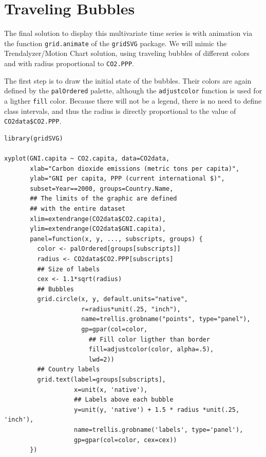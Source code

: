 \documentclass[smallroyalvopaper]{memoir}
\begin{document}
\section{\floweroneleft Traveling Bubbles}
\label{sec-6}
The final solution to display this multivariate time series is with
animation via the function \texttt{grid.animate} of the \texttt{gridSVG}
package. We will mimic the Trendalyzer/Motion Chart solution, using
traveling bubbles of different colors and with radius proportional to
\texttt{CO2.PPP}.

The first step is to draw the initial state of the bubbles. Their
colors are again defined by the \texttt{palOrdered} palette, although the
\texttt{adjustcolor} function is used for a ligther \texttt{fill} color. Because
there will not be a legend, there is no need to define class
intervals, and thus the radius is directly proportional to the value
of \texttt{CO2data\$CO2.PPP}.


\lstset{language=R,numbers=none}
\begin{lstlisting}
library(gridSVG)

xyplot(GNI.capita ~ CO2.capita, data=CO2data,
       xlab="Carbon dioxide emissions (metric tons per capita)",
       ylab="GNI per capita, PPP (current international $)",
       subset=Year==2000, groups=Country.Name,
       ## The limits of the graphic are defined
       ## with the entire dataset
       xlim=extendrange(CO2data$CO2.capita),
       ylim=extendrange(CO2data$GNI.capita),
       panel=function(x, y, ..., subscripts, groups) {
         color <- palOrdered[groups[subscripts]]
         radius <- CO2data$CO2.PPP[subscripts]
         ## Size of labels
         cex <- 1.1*sqrt(radius)
         ## Bubbles
         grid.circle(x, y, default.units="native",
                     r=radius*unit(.25, "inch"),
                     name=trellis.grobname("points", type="panel"),
                     gp=gpar(col=color,
                       ## Fill color ligther than border
                       fill=adjustcolor(color, alpha=.5),
                       lwd=2))
         ## Country labels
         grid.text(label=groups[subscripts],
                   x=unit(x, 'native'),
                   ## Labels above each bubble
                   y=unit(y, 'native') + 1.5 * radius *unit(.25, 'inch'),
                   name=trellis.grobname('labels', type='panel'),
                   gp=gpar(col=color, cex=cex))
       })
\end{lstlisting}
\end{document}
